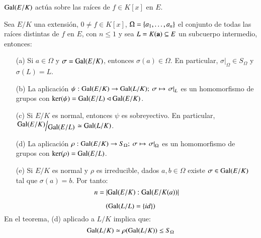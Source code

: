 \begin{obs}
    $\mathrm{Gal}(E/K)$ actúa sobre las raíces de $f \in K[x]$ en $E$.
\end{obs}

\begin{thm}\label{thm:3.11}
    Sea $E/K$ una extensión, $0 \neq f \in K[x]$, $\Omega = \left\{a_1, \ldots, a_n\right\}$ el conjunto de todas las raíces distintas de $f$ en $E$, con $n \leq 1$ y sea $L = K(\mathbf{a}) \subseteq E$ un subcuerpo intermedio, entonces:
    \begin{itemize}
        \item[(a)] Si $a \in \Omega$ y $\sigma = \mathrm{Gal}(E/K)$, entonces $\sigma(a) \in \Omega$. En particular, $\left.\sigma\right|_\Omega \in S_\Omega$ y $\sigma(L) = L$.
        \item[(b)] La aplicación $\psi: \mathrm{Gal}(E/K) \to \mathrm{Gal}(L/K);\ \sigma \mapsto \left.\sigma\right|_L$ es un homomorfismo de grupos con $\ker(\psi) = \mathrm{Gal}(E/L) \lhd \mathrm{Gal}(E/K)$.
        \item[(c)] Si $E/K$ es normal, entonces $\psi$ es sobreyectivo. En particular, $\quo{\gal(E/K)}{\gal(E/L)} \isom \gal(L/K)$.
        \item[(d)] La aplicación $\rho: \mathrm{Gal}(E/K) \to S_\Omega;\ \sigma \mapsto \left.\sigma\right|_\Omega$ es un homomorfismo de grupos con $\ker(\rho) = \mathrm{Gal}(E/L)$.
        \item[(e)] Si $E/K$ es normal y $\rho$ es irreducible, dados $a, b \in \Omega$ existe $\sigma \in \mathrm{Gal}(E/K)$ tal que $\sigma(a) = b$. Por tanto:
        $$
            n = \left|\mathrm{Gal}(E/K):\mathrm{Gal}(E/K(a))\right|
        $$
    \end{itemize}
\end{thm}

\begin{obs}
    $$
        \left(\mathrm{Gal}(L/L) = \left\{id\right\}\right)
    $$
    En el teorema, (d) aplicado a $L/K$ implica que:
    $$
        \mathrm{Gal}(L/K) \simeq \rho(\mathrm{Gal}(L/K)) \leq S_\Omega
    $$
\end{obs}

